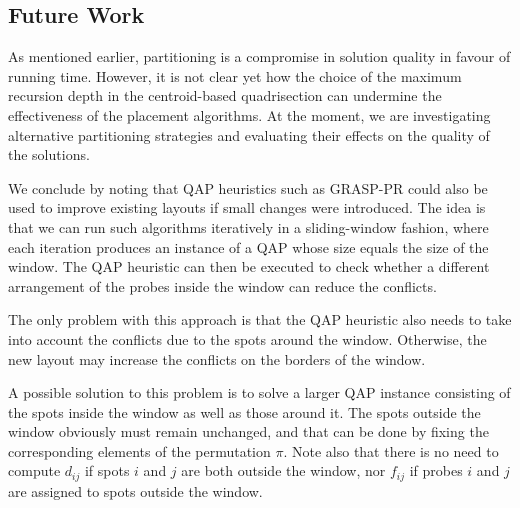 \documentclass{bioinfo}
\begin{document}
\subsection{Future Work}

As mentioned earlier, partitioning is a compromise in solution quality in favour of running time. However, it is not clear yet how the choice of the maximum recursion depth in the centroid-based quadrisection can undermine the effectiveness of the placement algorithms. At the moment, we are investigating alternative partitioning strategies and evaluating their effects on the quality of the solutions.

We conclude by noting that QAP heuristics such as GRASP-PR could also be used to improve existing layouts if small changes were introduced. The idea is that we can run such algorithms iteratively in a sliding-window fashion, where each iteration produces an instance of a QAP whose size equals the size of the window. The QAP heuristic can then be executed to check whether a different arrangement of the probes inside the window can reduce the conflicts.

The only problem with this approach is that the QAP heuristic also needs to take into account the conflicts due to the spots around the window. Otherwise, the new layout may increase the conflicts on the borders of the window.

A possible solution to this problem is to solve a larger QAP instance consisting of the spots inside the window as well as those around it. The spots outside the window obviously must remain unchanged, and that can be done by fixing the corresponding elements of the permutation $\pi$. Note also that there is no need to compute $d_{ij}$ if spots $i$ and $j$ are both outside the window, nor $f_{ij}$ if probes $i$ and $j$ are assigned to spots outside the window.
\end{document}
